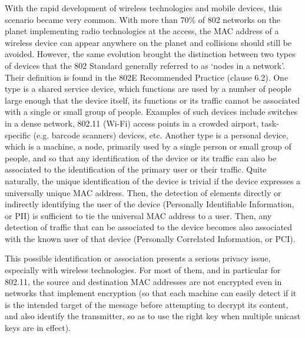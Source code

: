 \documentclass[10pt]{article}
\begin{document}
{	With the rapid development of wireless technologies and mobile devices, this scenario became very common. With more than 70\% of 802 networks on the planet implementing radio technologies at the access, the MAC address of a wireless device can appear anywhere on the planet and collisions should still be avoided. However, the same evolution brought the distinction between two types of devices that the 802 Standard generally referred to as ‘nodes in a network’. Their definition is found in the 802E Recommended Practice (clause 6.2). One type is a shared service device, which functions are used by a number of people large enough that the device itself, its functions or its traffic cannot be associated with a single or small group of people. Examples of such devices include switches in a dense network, 802.11 (Wi-Fi) access points in a crowded airport, task-specific (e.g. barcode scanners) devices, etc. Another type is a personal device, which is a machine, a node, primarily used by a single person or small group of people, and so that any identification of the device or its traffic can also be associated to the identification of the primary user or their traffic. Quite naturally, the unique identification of the device is trivial if the device expresses a universally unique MAC address. Then, the detection of elements directly or indirectly identifying the user of the device (Personally Identifiable Information, or PII) is sufficient to tie the universal MAC address to a user. Then, any detection of traffic that can be associated to the device becomes also associated with the known user of that device (Personally Correlated Information, or PCI). 
	
	This possible identification or association presents a serious privacy issue, especially with wireless technologies. For most of them, and in particular for 802.11, the source and destination MAC addresses are not encrypted even in networks that implement encryption (so that each machine can easily detect if it is the intended target of the message before attempting to decrypt its content, and also identify the transmitter, so as to use the right key when multiple unicast keys are in effect). 
	
}
\end{document}
